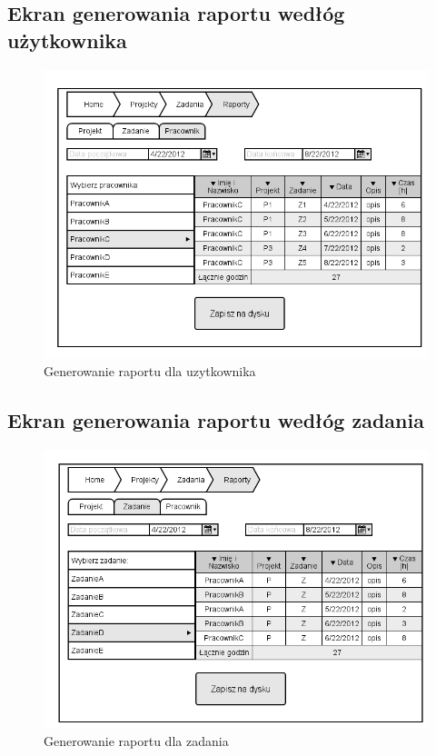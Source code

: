 \subsection{Ekran generowania raportu wedłóg użytkownika}
\begin{figure}[H]
    \centering
    \includegraphics[scale=0.7]{diagramy/intefejsy/Generowanie_raportu_dla_uzytkownika.png}
    \caption{Generowanie raportu dla uzytkownika}
    \label{fig:usecase}
\end{figure}

\subsection{Ekran generowania raportu wedłóg zadania}
\begin{figure}[H]
    \centering
    \includegraphics[scale=0.7]{diagramy/intefejsy/Generowanie_raportu_dla_zadania.png}
    \caption{Generowanie raportu dla zadania}
    \label{fig:usecase}
\end{figure}

